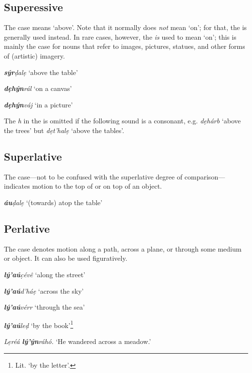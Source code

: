 \documentclass[a4paper, 12pt, twoside, openright, final]{book}
\def \b {ḅ}
\let \w \textit
\let \b \textbf
\begin{document}
\subsection{Superessive}
The  case means ‘above’. Note that it normally does \textit{not} mean
‘on’; for that, the  is generally used instead. In rare cases, however, the  \textit{is} used to mean
‘on’; this is mainly the case for nouns that refer to images, pictures, statues, and other forms of (artistic) imagery.
\begin{examples}
    \item \w{\b{sýr}ḍalẹ} ‘above the table’
    \item \w{\b{dẹhýn}rál} ‘on a canvas’
    \item \w{\b{dẹhýn}váj} ‘in a picture’
\end{examples}

The \w{h} in the  is omitted if the following sound is a consonant, e.g. \w{dẹhárb} ‘above the trees’
but \w{dẹt’halẹ} ‘above the tables’.

\subsection{Superlative}
The  case—not to be confused with the superlative degree of comparison—indicates motion to the top of or on
top of an object.
\begin{examples}
    \item \w{\b{áu}ḍalẹ} ‘(towards) atop the table’
\end{examples}

\subsection{Perlative}
The  case denotes motion along a path, across a plane, or through some medium or object. It can also
be used figuratively.
\begin{examples}
    \item \w{\b{lý’aú}c̣évê} ‘along the street’
    \item \w{\b{lý’aú}d’háẹ} ‘across the sky’
    \item \w{\b{lý’aú}vérr} ‘through the sea’
    \item \w{\b{lý’aú}leḍ} ‘by the book’\footnote{Lit. ‘by the letter’.}
    \item \w{Lẹréá \b{lý’ýn}ráhó.} ‘He wandered across a meadow.’
\end{examples}
\end{document}

